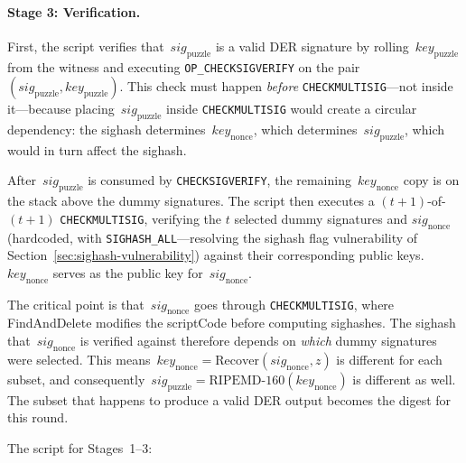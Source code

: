 \documentclass[11pt, a4paper]{article}
\begin{document}
\paragraph{Stage 3: Verification.}
First, the script verifies that~$\mathit{sig}_{\mathrm{puzzle}}$ is a valid DER signature by rolling~$\mathit{key}_{\mathrm{puzzle}}$ from the witness and executing \texttt{OP\_CHECKSIGVERIFY} on the pair~$(\mathit{sig}_{\mathrm{puzzle}}, \mathit{key}_{\mathrm{puzzle}})$. This check must happen \emph{before} \texttt{CHECKMULTISIG}---not inside it---because placing~$\mathit{sig}_{\mathrm{puzzle}}$ inside \texttt{CHECKMULTISIG} would create a circular dependency: the sighash determines~$\mathit{key}_{\mathrm{nonce}}$, which determines~$\mathit{sig}_{\mathrm{puzzle}}$, which would in turn affect the sighash.

After~$\mathit{sig}_{\mathrm{puzzle}}$ is consumed by \texttt{CHECKSIGVERIFY}, the remaining~$\mathit{key}_{\mathrm{nonce}}$ copy is on the stack above the dummy signatures. The script then executes a $(t+1)$-of-$(t+1)$ \texttt{CHECKMULTISIG}, verifying the $t$ selected dummy signatures and $\mathit{sig}_{\mathrm{nonce}}$ (hardcoded, with \texttt{SIGHASH\_ALL}---resolving the sighash flag vulnerability of Section~\ref{sec:sighash-vulnerability}) against their corresponding public keys. $\mathit{key}_{\mathrm{nonce}}$ serves as the public key for~$\mathit{sig}_{\mathrm{nonce}}$.

The critical point is that~$\mathit{sig}_{\mathrm{nonce}}$ goes through \texttt{CHECKMULTISIG}, where FindAndDelete modifies the scriptCode before computing sighashes. The sighash that~$\mathit{sig}_{\mathrm{nonce}}$ is verified against therefore depends on \emph{which} dummy signatures were selected. This means~$\mathit{key}_{\mathrm{nonce}} = \text{Recover}(\mathit{sig}_{\mathrm{nonce}}, z)$ is different for each subset, and consequently~$\mathit{sig}_{\mathrm{puzzle}} = \text{RIPEMD-160}(\mathit{key}_{\mathrm{nonce}})$ is different as well. The subset that happens to produce a valid DER output becomes the digest for this round.

The script for Stages~1--3:
\end{document}
